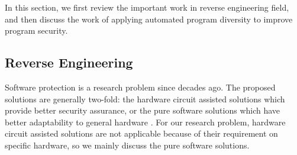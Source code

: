 \documentclass[10pt, conference]{IEEEtran}
\begin{document}
In this section, we first review the important work in reverse engineering field, and then discuss the work of applying automated program diversity to improve program security.

\subsection{Reverse Engineering}
Software protection is a research problem since decades ago.  The proposed solutions are generally two-fold: the hardware circuit assisted solutions which provide better security assurance, or the pure software solutions which have better adaptability to general hardware \cite{chen2003oblivious}.  For our research problem, hardware circuit assisted solutions are not applicable because of their requirement on specific hardware, so we mainly discuss the pure software solutions.
\end{document}
